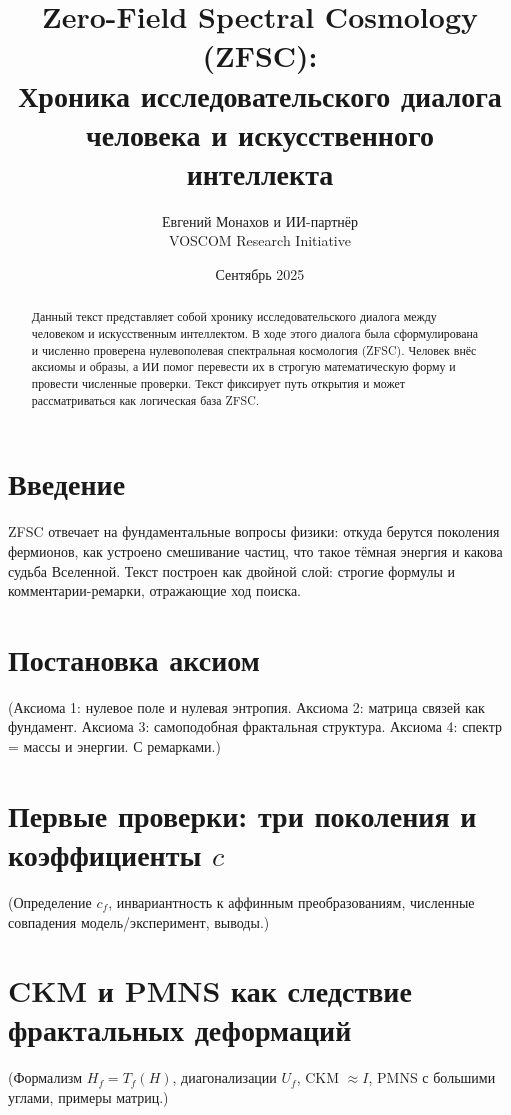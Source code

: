 \documentclass[12pt,a4paper]{article}
\title{Zero-Field Spectral Cosmology (ZFSC): \\
Хроника исследовательского диалога человека и искусственного интеллекта}
\author{Евгений Монахов и ИИ-партнёр \\ VOSCOM Research Initiative}
\date{Сентябрь 2025}
\begin{document}
\maketitle

\begin{abstract}
Данный текст представляет собой хронику исследовательского диалога между человеком и искусственным интеллектом.
В ходе этого диалога была сформулирована и численно проверена нулевополевая спектральная космология (ZFSC).
Человек внёс аксиомы и образы, а ИИ помог перевести их в строгую математическую форму и провести численные проверки.
Текст фиксирует путь открытия и может рассматриваться как логическая база ZFSC.
\end{abstract}

\section{Введение}
ZFSC отвечает на фундаментальные вопросы физики: откуда берутся поколения фермионов, как устроено смешивание частиц, что такое тёмная энергия и какова судьба Вселенной.
Текст построен как двойной слой: строгие формулы и комментарии-ремарки, отражающие ход поиска.

\section{Постановка аксиом}
(Аксиома 1: нулевое поле и нулевая энтропия.  
Аксиома 2: матрица связей как фундамент.  
Аксиома 3: самоподобная фрактальная структура.  
Аксиома 4: спектр = массы и энергии.  
С ремарками.)

\section{Первые проверки: три поколения и коэффициенты $c$}
(Определение $c_f$, инвариантность к аффинным преобразованиям, численные совпадения модель/эксперимент, выводы.)

\section{CKM и PMNS как следствие фрактальных деформаций}
(Формализм $H_f = T_f(H)$, диагонализации $U_f$, CKM $\approx I$, PMNS с большими углами, примеры матриц.)

\end{document}
